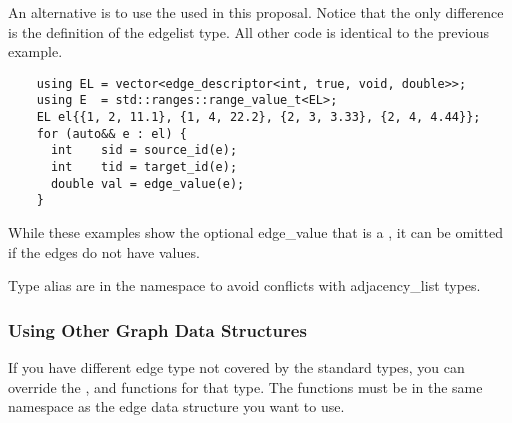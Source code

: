 An alternative is to use the  used in this proposal. Notice that the only difference
is the definition of the edgelist type. All other code is identical to the previous example.
\begin{lstlisting}
    using EL = vector<edge_descriptor<int, true, void, double>>;
    using E  = std::ranges::range_value_t<EL>;
    EL el{{1, 2, 11.1}, {1, 4, 22.2}, {2, 3, 3.33}, {2, 4, 4.44}};
    for (auto&& e : el) {
      int    sid = source_id(e);
      int    tid = target_id(e);
      double val = edge_value(e);
    }
\end{lstlisting}

While these examples show the optional edge\_value that is a , it can be omitted if the edges 
do not have values.

Type alias are in the namespace  to avoid conflicts with adjacency\_list
types.

\subsubsection{Using Other Graph Data Structures}
If you have different edge type not covered by the standard types, you can override the
,  and  functions for that type.
The functions must be in the same namespace as the edge data structure you want to use.

